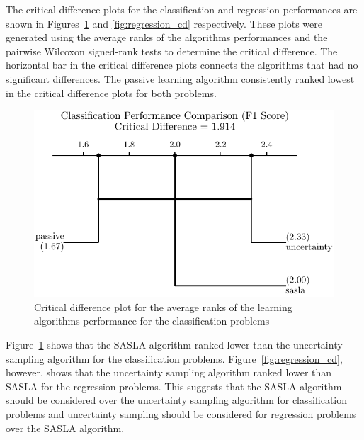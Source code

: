 \documentclass[conference]{IEEEtran}
\begin{document}
	The critical difference plots for the classification and regression performances are shown in Figures~\ref{fig:classification_cd} and \ref{fig:regression_cd} respectively. These plots were generated using the average ranks of the algorithms performances and the pairwise Wilcoxon signed-rank tests to determine the critical difference. The horizontal bar in the critical difference plots connects the algorithms that had no significant differences. The passive learning algorithm consistently ranked lowest in the critical difference plots for both problems. 
	
	\begin{figure}[htbp]
		\centering
		\includegraphics[width=\linewidth]{plots/classification_critical_difference.pdf}
		\caption{Critical difference plot for the average ranks of the learning algorithms performance for the classification problems}
		\label{fig:classification_cd}
	\end{figure}
	
	Figure~\ref{fig:classification_cd} shows that the SASLA algorithm ranked lower than the uncertainty sampling algorithm for the classification problems. Figure~\ref{fig:regression_cd}, however, shows that the uncertainty sampling algorithm ranked lower than SASLA for the regression problems. This suggests that the SASLA algorithm should be considered over the uncertainty sampling algorithm for classification problems and uncertainty sampling should be considered for regression problems over the SASLA algorithm. 
	
\end{document}
